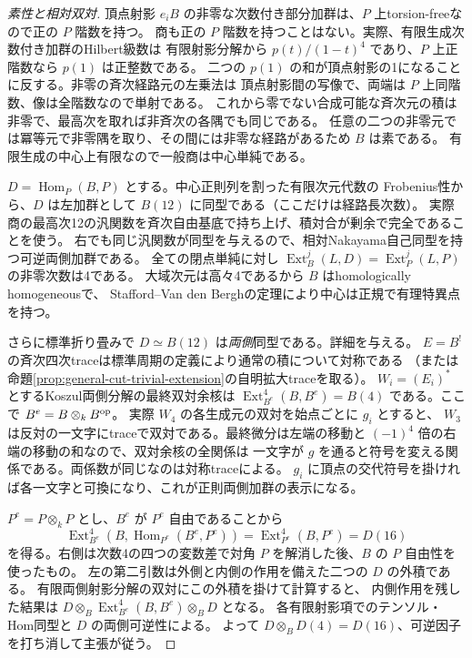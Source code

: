 \begin{proof}[素性と相対双対]
頂点射影 $e_iB$ の非零な次数付き部分加群は、$P$ 上torsion-freeなので正の $P$ 階数を持つ。
商も正の $P$ 階数を持つことはない。実際、有限生成次数付き加群のHilbert級数は
有限射影分解から $p(t)/(1-t)^4$ であり、$P$ 上正階数なら $p(1)$ は正整数である。
二つの $p(1)$ の和が頂点射影の1になることに反する。非零の斉次経路元の左乗法は
頂点射影間の写像で、両端は $P$ 上同階数、像は全階数なので単射である。
これから零でない合成可能な斉次元の積は非零で、最高次を取れば非斉次の各隅でも同じである。
任意の二つの非零元では冪等元で非零隅を取り、その間には非零な経路があるため $B$ は素である。
有限生成の中心上有限なので一般商は中心単純である。

$D=\operatorname{Hom}_P(B,P)$ とする。中心正則列を割った有限次元代数の
Frobenius性から、$D$ は左加群として $B(12)$ に同型である（ここだけは経路長次数）。
実際商の最高次12の汎関数を斉次自由基底で持ち上げ、積対合が剰余で完全であることを使う。
右でも同じ汎関数が同型を与えるので、相対Nakayama自己同型を持つ可逆両側加群である。
全ての閉点単純に対し $\operatorname{Ext}^j_B(L,D)=\operatorname{Ext}^j_P(L,P)$ の非零次数は4である。
大域次元は高々4であるから $B$ はhomologically homogeneousで、
Stafford--Van den Berghの定理により中心は正規で有理特異点を持つ。

さらに標準折り畳みで $D\simeq B(12)$ は\emph{両側}同型である。詳細を与える。
$E=B^!$ の斉次四次traceは標準周期の定義により通常の積について対称である
（または命題\ref{prop:general-cut-trivial-extension}の自明拡大traceを取る）。
$W_i=(E_i)^*$ とするKoszul両側分解の最終双対余核は
$\operatorname{Ext}_{B^e}^4(B,B^e)=B(4)$ である。ここで $B^e=B\otimes_k B^{\rm op}$。
実際 $W_4$ の各生成元の双対を始点ごとに $g_i$ とすると、
$W_3$ は反対の一文字にtraceで双対である。最終微分は左端の移動と
$(-1)^4$ 倍の右端の移動の和なので、双対余核の全関係は
一文字が $g$ を通ると符号を変える関係である。両係数が同じなのは対称traceによる。
$g_i$ に頂点の交代符号を掛ければ各一文字と可換になり、これが正則両側加群の表示になる。

$P^e=P\otimes_k P$ とし、$B^e$ が $P^e$ 自由であることから
\[
 \operatorname{Ext}^4_{B^e}(B,\operatorname{Hom}_{P^e}(B^e,P^e))
 =\operatorname{Ext}^4_{P^e}(B,P^e)=D(16)
\]
を得る。右側は次数4の四つの変数差で対角 $P$ を解消した後、$B$ の $P$ 自由性を使ったもの。
左の第二引数は外側と内側の作用を備えた二つの $D$ の外積である。
有限両側射影分解の双対にこの外積を掛けて計算すると、
内側作用を残した結果は
$D\otimes_B\operatorname{Ext}^4_{B^e}(B,B^e)\otimes_B D$ となる。
各有限射影項でのテンソル・Hom同型と $D$ の両側可逆性による。
よって $D\otimes_B D(4)=D(16)$、可逆因子を打ち消して主張が従う。
\end{proof}

